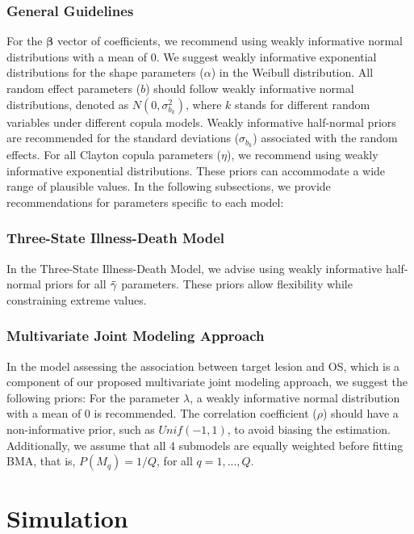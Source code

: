 \subsubsection{General Guidelines}

For the $\boldsymbol{\beta}$ vector of coefficients, we recommend using weakly informative normal distributions with a mean of 0. We suggest weakly informative exponential distributions for the shape parameters ($\alpha$) in the Weibull distribution. All random effect parameters ($b$) should follow weakly informative normal distributions, denoted as $N(0, \sigma_{b_k}^2)$, where $k$ stands for different random variables under different copula models. Weakly informative half-normal priors are recommended for the standard deviations ($\sigma_{b_k}$) associated with the random effects. For all Clayton copula parameters ($\eta$), we recommend using weakly informative exponential distributions. These priors can accommodate a wide range of plausible values. In the following subsections, we provide recommendations for parameters specific to each model:

\subsubsection{Three-State Illness-Death Model}

In the Three-State Illness-Death Model, we advise using weakly informative half-normal priors for all $\Tilde{\gamma}$ parameters. These priors allow flexibility while constraining extreme values.

\subsubsection{Multivariate Joint Modeling Approach}

In the model assessing the association between target lesion and OS, which is a component of our proposed multivariate joint modeling approach, we suggest the following priors: For the parameter $\lambda$, a weakly informative normal distribution with a mean of 0 is recommended. The correlation coefficient ($\rho$) should have a non-informative prior, such as $Unif(-1, 1)$, to avoid biasing the estimation. Additionally, we assume that all 4 submodels are equally weighted before fitting BMA, that is, $P(M_q) = 1/Q$, for all $q = 1,...,Q$.


\section{Simulation}
\label{sec:simulation}

